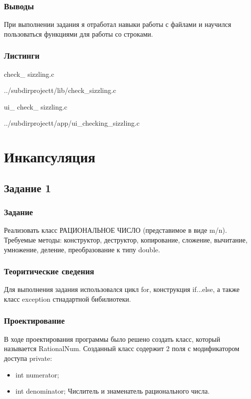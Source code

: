 \documentclass[12pt,a4paper]{report}
\begin{document}
\subsection{Выводы}

При выполнении задания я отработал навыки работы с файлами и научился пользоваться функциями для работы со строками.
\subsection*{Листинги}
check\_ sizzling.c

{../subdirprojectt/lib/check_sizzling.c}

\vspace{\baselineskip}

ui\_ check\_ sizzling.c

{../subdirprojectt/app/ui_checking_sizzling.c}


\chapter{Инкапсуляция}
\section{Задание 1}
\subsection{Задание}

Реализовать класс РАЦИОНАЛЬНОЕ ЧИСЛО (представимое в виде m/n). Требуемые методы: конструктор, деструктор, копирование, сложение, вычитание, умножение, деление, преобразование к типу double.

\subsection{Теоритические сведения}

Для выполнения задания использовался цикл for, конструкция if...else, а также класс exception стнадартной бибилиотеки.

\subsection{Проектирование}


В ходе проектирования программы было решено создать класс, который называется RationalNum.
Созданный класс содержит 2 поля с модификатором доступа private:

\begin{itemize}
	\item  int numerator;
    \item  int denominator;
    Числитель и знаменатель рационального числа.
\end{itemize}
	
\end{document}
